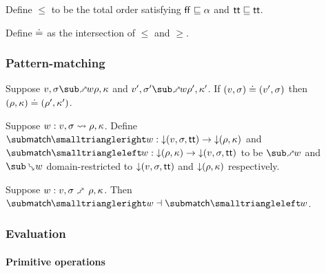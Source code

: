 \begin{definition}
   Define $\leq$ to be the total order satisfying $\mathsf{ff} \sqsubseteq \alpha$ and $\mathsf{tt} \sqsubseteq \mathsf{tt}$.
\end{definition}

\begin{definition}
   Define $\doteq$ as the intersection of $\leq$ and $\geq$.
\end{definition}




\subsubsection{Pattern-matching}




\begin{lemma}
   Suppose $v, \sigma \matchFwdR{w} \rho, \kappa$ and $v', \sigma' \matchFwdR{w} \rho', \kappa'$. If $(v, \sigma) \doteq (v', \sigma)$ then $(\rho, \kappa) \doteq (\rho', \kappa')$.
\end{lemma}

\begin{definition}
   Suppose $w: v, \sigma \rightsquigarrow \rho, \kappa$. Define $\matchFwdF{w}: \Below{(v,\sigma,\TT)} \to \Below{(\rho,\kappa)}$ and $\matchBwdF{w}: \Below{(\rho,\kappa)} \to \Below{(v,\sigma,\TT)}$ to be $\matchFwdR{w}$ and $\matchBwdR{w}$ domain-restricted to ${\downarrow}{(v,\sigma,\mathsf{tt})}$ and ${\downarrow}{(\rho,\kappa)}$ respectively.
\end{definition}

\begin{theorem}
\label{thm:core-language:match:gc}
   Suppose $w: v, \sigma \matchFwdS \rho, \kappa$.  Then $\matchFwdF{w} \adjoint \matchBwdF{w}$.
\end{theorem}

\subsubsection{Evaluation}

\paragraph{Primitive operations}


